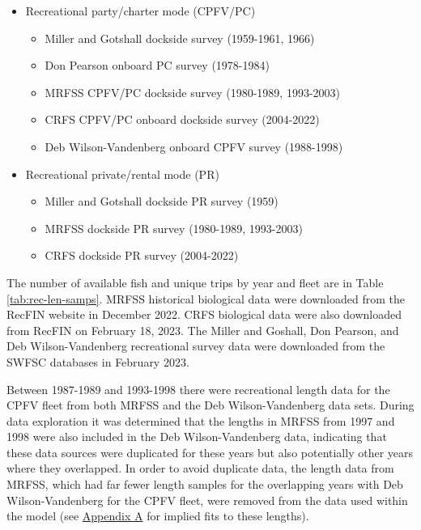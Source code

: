 \documentclass[11pt,
  english,
  letterpaper,
]{article}
\providecommand{\tightlist}{%
  \setlength{\itemsep}{0pt}\setlength{\parskip}{0pt}}
\providecommand{\tightlist}{%
  \setlength{\itemsep}{0pt}\setlength{\parskip}{0pt}}
\begin{document}
\begin{itemize}
\item
  Recreational party/charter mode (CPFV/PC)

  \begin{itemize}
  \tightlist
  \item
    Miller and Gotshall dockside survey (1959-1961, 1966)
  \item
    Don Pearson onboard PC survey (1978-1984)
  \item
    MRFSS CPFV/PC dockside survey (1980-1989, 1993-2003)
  \item
    CRFS CPFV/PC onboard dockside survey (2004-2022)
  \item
    Deb Wilson-Vandenberg onboard CPFV survey (1988-1998)
  \end{itemize}
\item
  Recreational private/rental mode (PR)

  \begin{itemize}
  \tightlist
  \item
    Miller and Gotshall dockside PR survey (1959)
  \item
    MRFSS dockside PR survey (1980-1989, 1993-2003)
  \item
    CRFS dockside PR survey (2004-2022)
  \end{itemize}
\end{itemize}

The number of available fish and unique trips by year and fleet are in Table \ref{tab:rec-len-samps}. MRFSS historical biological data were downloaded from the RecFIN website in December 2022. CRFS biological data were also downloaded from RecFIN on February 18, 2023. The Miller and Goshall, Don Pearson, and Deb Wilson-Vandenberg recreational survey data were downloaded from the SWFSC databases in February 2023.

Between 1987-1989 and 1993-1998 there were recreational length data for the CPFV fleet from both MRFSS and the Deb Wilson-Vandenberg data sets. During data exploration it was determined that the lengths in MRFSS from 1997 and 1998 were also included in the Deb Wilson-Vandenberg data, indicating that these data sources were duplicated for these years but also potentially other years where they overlapped. In order to avoid duplicate data, the length data from MRFSS, which had far fewer length samples for the overlapping years with Deb Wilson-Vandenberg for the CPFV fleet, were removed from the data used within the model (see \protect\hyperlink{excluded-data}{Appendix A} for implied fits to these lengths).
\end{document}
